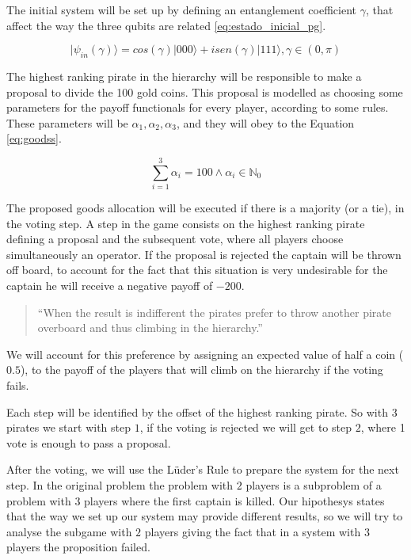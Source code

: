 The initial system will be set up by defining an entanglement coefficient $\gamma$, that affect the way the three qubits are related \ref{eq:estado_inicial_pg}.
 
\begin{equation}
\label{eq:estado_inicial_pg}
\vert \psi_{in}(\gamma) \rangle= cos( \gamma)\vert 000\rangle+ isen(\gamma)\vert 111 \rangle, \gamma \in (0,\pi)
\end{equation}

The highest ranking pirate in the hierarchy will be responsible to make a proposal to divide the 100 gold coins. This proposal is modelled as choosing some parameters for the payoff functionals for every player, according to some rules. These parameters will be $\alpha_{1}, \alpha_{2}, \alpha_{3}$, and they will obey to the Equation \ref{eq:goodss}.

\begin{equation}
\label{eq:goodss}
\sum_{i=1}^{3}\alpha_{i}=100\wedge\alpha_{i}\in\mathbb{N}_{0}
\end{equation}

The proposed goods allocation will be executed if there is a majority (or a tie), in the voting step. A step in the game consists on the highest ranking pirate defining a proposal and the subsequent vote, where all players choose simultaneously an operator. If the proposal is rejected the captain will be thrown off board, to account for the fact that this situation is very undesirable for the captain he will receive a negative payoff of $-200$.

\begin{quotation}
``When the result is indifferent the pirates prefer to throw another pirate overboard and thus climbing in the hierarchy.''
\end{quotation}

We will account for this preference by assigning an expected value of half a coin ($0.5$), to the payoff of the players that will climb on the hierarchy if the voting fails.

Each step will be identified by the offset of the highest ranking pirate. So with $3$ pirates we start with step $1$, if the voting is rejected we will get to step $2$, where 1 vote is enough to pass a proposal.

After the voting, we will use the L\"{u}der's Rule to prepare the system for the next step. In the original problem the problem with $2$ players is a subproblem of a problem with $3$ players where the first captain is killed. Our hipothesys states that the way we set up our system may provide different results, so we will try to analyse the subgame with $2$ players giving the fact that in a system with $3$ players the proposition failed. 

